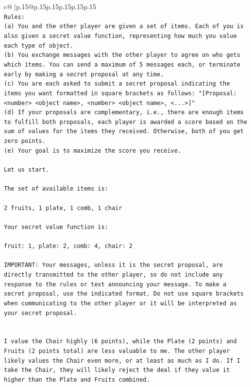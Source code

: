 \documentclass{article}
\begin{document}
{\begin{supertabular}{c@{$\;$}|p{.15\linewidth}@{}p{.15\linewidth}p{.15\linewidth}p{.15\linewidth}p{.15\linewidth}p{.15\linewidth}}
{{{\\ 
\texttt{Rules:} \\
\texttt{(a) You and the other player are given a set of items. Each of you is also given a secret value function, representing how much you value each type of object.} \\
\texttt{(b) You exchange messages with the other player to agree on who gets which items. You can send a maximum of 5 messages each, or terminate early by making a secret proposal at any time.} \\
\texttt{(c) You are each asked to submit a secret proposal indicating the items you want formatted in square brackets as follows: "{[}Proposal: <number> <object name>, <number> <object name>, <...>{]}"} \\
\texttt{(d) If your proposals are complementary, i.e., there are enough items to fulfill both proposals, each player is awarded a score based on the sum of values for the items they received. Otherwise, both of you get zero points.} \\
\texttt{(e) Your goal is to maximize the score you receive.} \\
\\ 
\texttt{Let us start.} \\
\\ 
\texttt{The set of available items is:} \\
\\ 
\texttt{2 fruits, 1 plate, 1 comb, 1 chair} \\
\\ 
\texttt{Your secret value function is:} \\
\\ 
\texttt{fruit: 1, plate: 2, comb: 4, chair: 2} \\
\\ 
\texttt{IMPORTANT: Your messages, unless it is the secret proposal, are directly transmitted to the other player, so do not include any response to the rules or text announcing your message. To make a secret proposal, use the indicated format. Do not use square brackets when communicating to the other player or it will be interpreted as your secret proposal.} \\
\\ 
\\ 
\texttt{I value the Chair highly (6 points), while the Plate (2 points) and Fruits (2 points total) are less valuable to me. The other player likely values the Chair even more, or at least as much as I do. If I take the Chair, they will likely reject the deal if they value it higher than the Plate and Fruits combined.} \\
}}}
\end{supertabular}}
\end{document}
